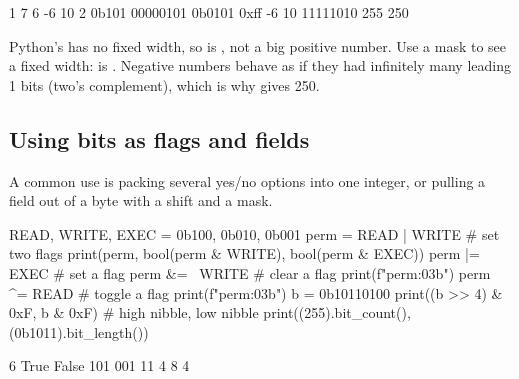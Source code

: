 \begin{rawcode}
1 7 6 -6 10 2
0b101 00000101 0b0101 0xff
-6 10 11111010
255 250
\end{rawcode}

\begin{typecheck}
Python's  has no fixed width, so  is , not a big positive number.
Use a mask to see a fixed width:  is . Negative numbers behave as if
they had infinitely many leading 1 bits (two's complement), which is why  gives
250.
\end{typecheck}

\subsection{Using bits as flags and fields}

A common use is packing several yes/no options into one integer, or pulling a field out of a
byte with a shift and a mask.

\begin{pycode}
READ, WRITE, EXEC = 0b100, 0b010, 0b001
perm = READ | WRITE              # set two flags
print(perm, bool(perm & WRITE), bool(perm & EXEC))
perm |= EXEC                     # set a flag
perm &= ~WRITE                   # clear a flag
print(f"{perm:03b}")
perm ^= READ                     # toggle a flag
print(f"{perm:03b}")
b = 0b10110100
print((b >> 4) & 0xF, b & 0xF)   # high nibble, low nibble
print((255).bit_count(), (0b1011).bit_length())
\end{pycode}
\begin{rawcode}
6 True False
101
001
11 4
8 4
\end{rawcode}

\begin{center}
\end{center}

